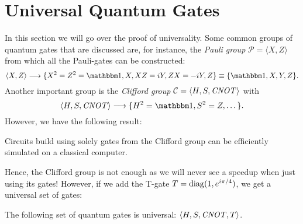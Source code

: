 	\section{Universal Quantum Gates}
		In this section we will go over the proof of universality. Some common groups of quantum gates that are discussed are, for instance, the \emph{Pauli group} \( \mathcal{P} = \langle X, Z \rangle \) from which all the Pauli-gates can be constructed:
		\begin{equation}
			\langle X, Z \rangle
				\longto \{ X^2 = Z^2 = \ID, X, XZ = iY, ZX = -iY, Z \}
				\equiv \{ \ID, X, Y, Z \}.
		\end{equation}
		Another important group is the \emph{Clifford group} \( \mathcal{C} = \langle H, S, \mathit{CNOT} \rangle \) with
		\begin{equation}
			\langle H, S, \CNOT \rangle
				\longto \{ H^2 = \ID, S^2 = Z, \dots \}.
		\end{equation}
		However, we have the following result:
		\begin{theorem}
			Circuits build using solely gates from the Clifford group can be efficiently simulated on a classical computer.
		\end{theorem}
		Hence, the Clifford group is not enough as we will never see a speedup when just using its gates! However, if we add the T-gate \( T = \operatorname{diag}(1, e^{i \pi / 4}) \), we get a universal set of gates:
		\begin{theorem}
			The following set of quantum gates is universal: \( \langle H, S, \mathit{CNOT}, T \rangle \).
		\end{theorem}
